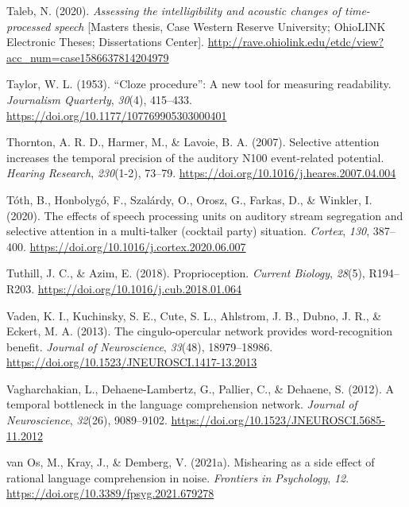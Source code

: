 \documentclass[a4paper, nobind]{templates/ociamthesis}
\newlength{\cslhangindent}
\newenvironment{CSLReferences}[2] %
 {%
  \setlength{\parindent}{0pt}
  \ifodd #1
  \let\oldpar\par
  \def\par{\hangindent=\cslhangindent\oldpar}
  \fi
  \setlength{\parskip}{1mm}
  \setlength{\baselineskip}{6mm}
 }%
 {}
\begin{document}
\begin{CSLReferences}{1}{0}
\leavevmode{}%
Taleb, N. (2020). \emph{Assessing the intelligibility and acoustic changes of time-processed speech} {[}Masters thesis, Case Western Reserve University; OhioLINK Electronic Theses; Dissertations Center{]}. \url{http://rave.ohiolink.edu/etdc/view?acc_num=case1586637814204979}

\leavevmode{}%
Taylor, W. L. (1953). {``Cloze procedure''}: A new tool for measuring readability. \emph{Journalism Quarterly}, \emph{30}(4), 415--433. \url{https://doi.org/10.1177/107769905303000401}

\leavevmode{}%
Thornton, A. R. D., Harmer, M., \& Lavoie, B. A. (2007). {Selective attention increases the temporal precision of the auditory N100 event-related potential}. \emph{Hearing Research}, \emph{230}(1-2), 73--79. \url{https://doi.org/10.1016/j.heares.2007.04.004}

\leavevmode{}%
Tóth, B., Honbolygó, F., Szalárdy, O., Orosz, G., Farkas, D., \& Winkler, I. (2020). {The effects of speech processing units on auditory stream segregation and selective attention in a multi-talker (cocktail party) situation}. \emph{Cortex}, \emph{130}, 387--400. \url{https://doi.org/10.1016/j.cortex.2020.06.007}

\leavevmode{}%
Tuthill, J. C., \& Azim, E. (2018). Proprioception. \emph{Current Biology}, \emph{28}(5), R194--R203. \url{https://doi.org/10.1016/j.cub.2018.01.064}

\leavevmode{}%
Vaden, K. I., Kuchinsky, S. E., Cute, S. L., Ahlstrom, J. B., Dubno, J. R., \& Eckert, M. A. (2013). {The cingulo-opercular network provides word-recognition benefit}. \emph{Journal of Neuroscience}, \emph{33}(48), 18979--18986. \url{https://doi.org/10.1523/JNEUROSCI.1417-13.2013}

\leavevmode{}%
Vagharchakian, L., Dehaene-Lambertz, G., Pallier, C., \& Dehaene, S. (2012). {A temporal bottleneck in the language comprehension network}. \emph{Journal of Neuroscience}, \emph{32}(26), 9089--9102. \url{https://doi.org/10.1523/JNEUROSCI.5685-11.2012}

\leavevmode{}%
van Os, M., Kray, J., \& Demberg, V. (2021a). Mishearing as a side effect of rational language comprehension in noise. \emph{Frontiers in Psychology}, \emph{12}. \url{https://doi.org/10.3389/fpsyg.2021.679278}


\end{CSLReferences}
\end{document}
